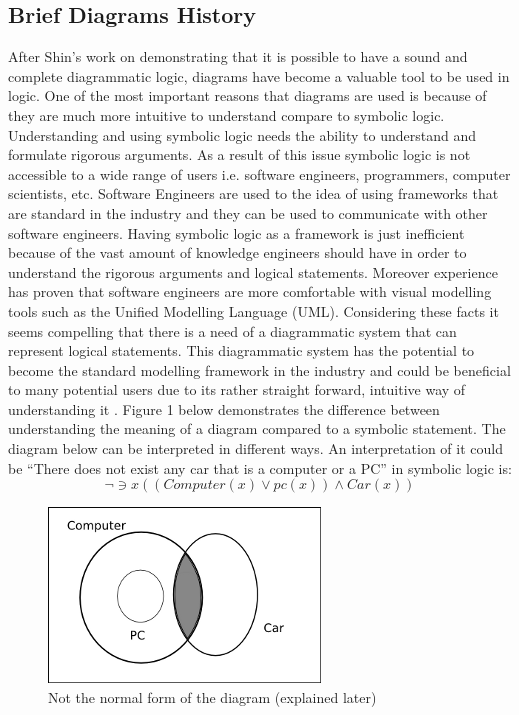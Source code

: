 \documentclass[a4paper]{article}
\begin{document}
\subsection{Brief Diagrams History}
After Shin's \cite{Shin_1994} work on demonstrating that it is possible to have a sound and complete diagrammatic logic, diagrams have become a valuable tool to be used in logic. One of the most important reasons that diagrams are used is because of they are much more intuitive to understand compare to symbolic logic. Understanding and using symbolic logic needs the ability to understand and formulate rigorous arguments. As a result of this issue symbolic logic is not accessible to a wide range of users i.e. software engineers, programmers, computer scientists, etc. Software Engineers are used to the idea of using frameworks that are standard in the industry and they can be used to communicate with other software engineers. Having symbolic logic as a framework is just inefficient because of the vast amount of knowledge engineers should have in order to understand  the rigorous arguments and logical statements. Moreover experience has proven that software engineers are more comfortable with visual modelling tools such as the Unified Modelling Language (UML). Considering these facts it seems compelling that there is a need of a diagrammatic system that can represent logical statements. This diagrammatic system has the potential to become the standard modelling framework in the industry and could be beneficial to many potential users due to its rather straight forward, intuitive way of understanding it \cite{Gem_1}.
Figure 1 below demonstrates the difference between understanding the meaning of a diagram compared to a symbolic statement. The diagram below can be interpreted in different ways. An interpretation of it could be “There does not exist any car that is a computer or a PC” in symbolic logic is:
$$ \neg\ni x ((Computer(x) \vee pc(x)) \wedge Car(x))$$
\begin{figure}[h]
\centering
\includegraphics{images/diag2_21.png}
\caption{Not the normal form of the diagram (explained later)}
\end{figure}
\end{document}
